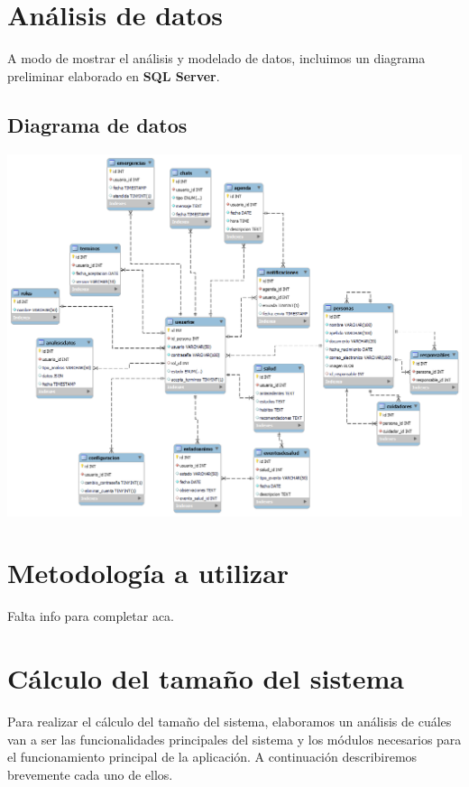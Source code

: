 \documentclass[a4paper,12pt]{article}
\begin{document}
    \newpage

    \section{Análisis de datos}
    \par A modo de mostrar el análisis y modelado de datos, incluimos un diagrama preliminar elaborado en \textbf{SQL Server}.
    \\
    \subsection{Diagrama de datos}
    \par \includegraphics[width=1\textwidth]{Imagenes/DER.png}

    \newpage

    \section{Metodología a utilizar}
    \par Falta info para completar aca.

    \newpage

    \section{Cálculo del tamaño del sistema}
    \par Para realizar el cálculo del tamaño del sistema, elaboramos un análisis de cuáles van a ser las funcionalidades principales del sistema y los módulos necesarios para el funcionamiento principal de la aplicación. A continuación describiremos brevemente cada uno de ellos.
\end{document}
